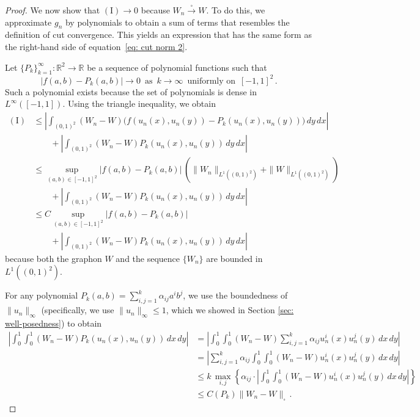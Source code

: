 \documentclass[11pt]{amsart}
\def\R{\mathbb{R}}
\def\ra{\rightarrow}
\def\sqra{\stackrel{\square}{\longrightarrow}}
\numberwithin{equation}{section}
\begin{document}
{{\begin{proof}
We now show that {$(\mathrm{I}) \ra 0$} because $W_n \sqra W$. {To do this}, we approximate $g_n$ by polynomials to obtain a sum of terms that resembles the definition of cut convergence. This yields an expression that has the same form as the right-hand side of equation~\eqref{eq: cut norm 2}.

Let {$\{P_k\}_{k=1}^\infty : \R^2 \to \R$} be a sequence of polynomial functions such that
\begin{equation*}
    |f(a,b) - P_k(a,b)| \to 0 \,\text{ as }\, k \to \infty \,\text{ uniformly on }\, [-1,1]^2 \,. 
\end{equation*}
Such a polynomial exists because the set of polynomials is dense in $L^\infty([-1,1])$. Using the triangle inequality, we obtain
\begin{equation*}
    \begin{split}
        {(\mathrm{I})} &\leq \left| \int_{(0,1)^2} (W_n - W)\big( f(u_n(x),u_n(y)) - P_k(u_n(x),u_n(y)) \big) \,dy\, dx \right| \\
            &\qquad + \left| \int_{(0,1)^2} (W_n - W) P_k(u_n(x),u_n(y)) \,dy\,dx \right| \\
        &\leq \sup_{(a,b) \in [-1,1]^2 } |f(a,b) - P_k(a,b)| \, \left(  \| W_n \|_{L^1((0,1)^2)} + \| W \|_{L^1((0,1)^2)} \right)  \\
        &\qquad + \left| \int_{(0,1)^2} (W_n-W) P_k(u_n(x),u_n(y)) \,dy\,dx \right| \\
        &\leq C \sup_{(a,b) \in [-1,1]^2 } |f(a,b) - P_k(a,b)| \\
        &\qquad + \left| \int_{(0,1)^2} (W_n - W) P_k(u_n(x),u_n(y)) \,dy\,dx \right|
    \end{split}
\end{equation*}
because both the graphon $W$ and the sequence $\{ W_n \}$ are bounded in $L^1((0,1)^2)$.

For any polynomial $P_k(a,b) = \sum_{i,j = 1}^k \alpha_{ij} a^i b^j$, we use the boundedness of $\|u_n\|_\infty$ 
(specifically, we use $\| u_n \|_\infty \leq 1$, which we showed in Section \ref{sec: well-posedness}) to obtain
\begin{align*}
    \left| \int_0^1\int_0^1 (W_n - W) P_k(u_n(x),u_n(y)) \, dx\,dy \right| &= \left| \int_0^1\int_0^1 (W_n - W) \sum_{i,j=1}^k  \alpha_{ij} u_n^i(x) u_n^j(y) \,dx\,dy \right|  \\
    &= \left| \sum_{i,j = 1}^k \alpha_{ij} \int_0^1\int_0^1 (W_n - W) u_n^i(x) u_n^j(y) \,dx\,dy \right| \\
    &\leq k \, {{\max_{i,j}}\left\{\alpha_{ij} \cdot \left|\int_0^1\int_0^1 (W_n - W) u_n^i(x) u_n^j(y) \,dx\,dy \right|\right\}} \\
    &\leq C(P_k) \|W_n - W\|_\square \,.
\end{align*}


\end{proof}}}
\end{document}
